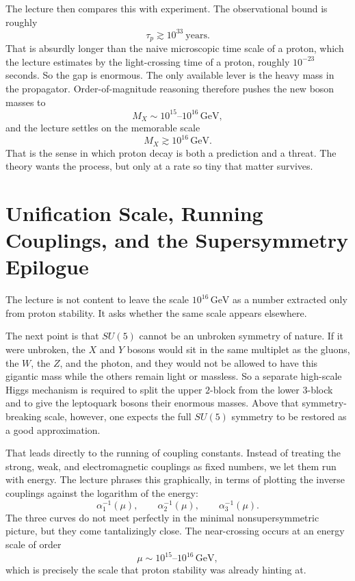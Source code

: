 The lecture then compares this with experiment. The observational bound is roughly
\begin{equation}
\tau_p \gtrsim 10^{33}\ \text{years}.
\end{equation}
That is absurdly longer than the naive microscopic time scale of a proton, which the lecture estimates by the light-crossing time of a proton, roughly \(10^{-23}\) seconds. So the gap is enormous. The only available lever is the heavy mass in the propagator. Order-of-magnitude reasoning therefore pushes the new boson masses to
\begin{equation}
M_X \sim 10^{15}\text{--}10^{16}\,\mathrm{GeV},
\end{equation}
and the lecture settles on the memorable scale
\begin{equation}
M_X \gtrsim 10^{16}\,\mathrm{GeV}.
\end{equation}
That is the sense in which proton decay is both a prediction and a threat. The theory wants the process, but only at a rate so tiny that matter survives.

\section{Unification Scale, Running Couplings, and the Supersymmetry Epilogue}

The lecture is not content to leave the scale \(10^{16}\,\mathrm{GeV}\) as a number extracted only from proton stability. It asks whether the same scale appears elsewhere.

The next point is that \(SU(5)\) cannot be an unbroken symmetry of nature. If it were unbroken, the \(X\) and \(Y\) bosons would sit in the same multiplet as the gluons, the \(W\), the \(Z\), and the photon, and they would not be allowed to have this gigantic mass while the others remain light or massless. So a separate high-scale Higgs mechanism is required to split the upper \(2\)-block from the lower \(3\)-block and to give the leptoquark bosons their enormous masses. Above that symmetry-breaking scale, however, one expects the full \(SU(5)\) symmetry to be restored as a good approximation.

That leads directly to the running of coupling constants. Instead of treating the strong, weak, and electromagnetic couplings as fixed numbers, we let them run with energy. The lecture phrases this graphically, in terms of plotting the inverse couplings against the logarithm of the energy:
\begin{equation}
\alpha_1^{-1}(\mu),\qquad \alpha_2^{-1}(\mu),\qquad \alpha_3^{-1}(\mu).
\end{equation}
The three curves do not meet perfectly in the minimal nonsupersymmetric picture, but they come tantalizingly close. The near-crossing occurs at an energy scale of order
\begin{equation}
\mu \sim 10^{15}\text{--}10^{16}\,\mathrm{GeV},
\end{equation}
which is precisely the scale that proton stability was already hinting at.

